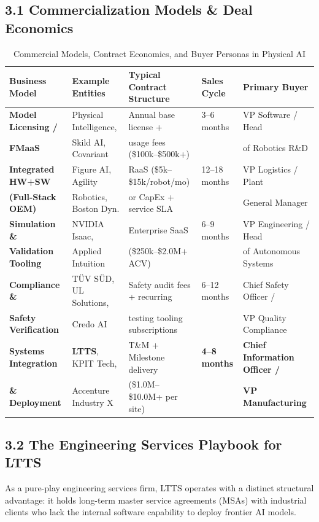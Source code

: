 \documentclass[11pt,a4paper]{article}
\begin{document}
\subsection{3.1 Commercialization Models \& Deal Economics}
\begin{table}[h!]
\centering
\small
\begin{tabularx}{\textwidth}{@{}l p{3.5cm} p{2.8cm} l p{3.2cm}@{}}
\toprule
\textbf{Business Model} & \textbf{Example Entities} & \textbf{Typical Contract Structure} & \textbf{Sales Cycle} & \textbf{Primary Buyer} \\
\midrule
\textbf{Model Licensing /} & Physical Intelligence, & Annual base license + & 3--6 months & VP Software / Head \\
\textbf{FMaaS} & Skild AI, Covariant & usage fees (\$100k--\$500k+) & & of Robotics R\&D \\
\addlinespace
\textbf{Integrated HW+SW} & Figure AI, Agility & RaaS (\$5k--\$15k/robot/mo) & 12--18 months & VP Logistics / Plant \\
\textbf{(Full-Stack OEM)} & Robotics, Boston Dyn. & or CapEx + service SLA & & General Manager \\
\addlinespace
\textbf{Simulation \&} & NVIDIA Isaac, & Enterprise SaaS & 6--9 months & VP Engineering / Head \\
\textbf{Validation Tooling} & Applied Intuition & (\$250k--\$2.0M+ ACV) & & of Autonomous Systems \\
\addlinespace
\textbf{Compliance \&} & TÜV SÜD, UL Solutions, & Safety audit fees + recurring & 6--12 months & Chief Safety Officer / \\
\textbf{Safety Verification} & Credo AI & testing tooling subscriptions & & VP Quality Compliance \\
\addlinespace
\textbf{Systems Integration} & \textbf{LTTS}, KPIT Tech, & T\&M + Milestone delivery & \textbf{4--8 months} & \textbf{Chief Information Officer /} \\
\textbf{\& Deployment} & Accenture Industry X & (\$1.0M--\$10.0M+ per site) & & \textbf{VP Manufacturing} \\
\bottomrule
\end{tabularx}
\caption{Commercial Models, Contract Economics, and Buyer Personas in Physical AI}
\end{table}

\subsection{3.2 The Engineering Services Playbook for LTTS}
As a pure-play engineering services firm, LTTS operates with a distinct structural advantage: it holds long-term master service agreements (MSAs) with industrial clients who lack the internal software capability to deploy frontier AI models.
\end{document}
